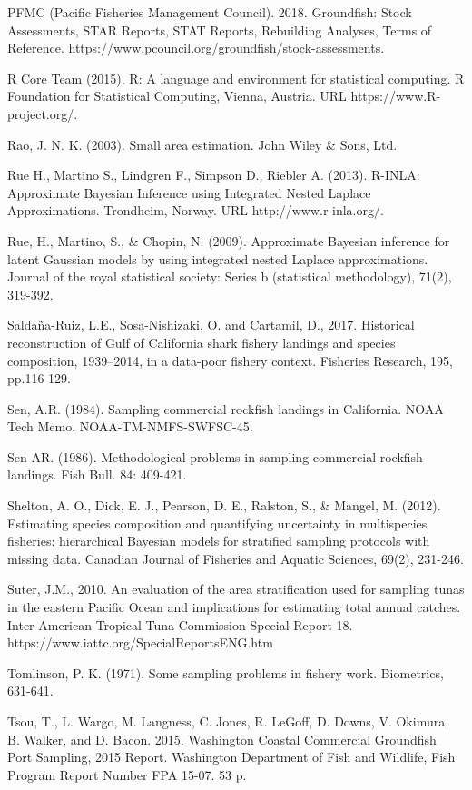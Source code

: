 \documentclass[12pt]{article}
\begin{document}
\begin{thebibliography}{1}
%
 PFMC (Pacific Fisheries Management Council). 2018. 
Groundfish: Stock Assessments, STAR Reports, STAT Reports, Rebuilding 
Analyses, Terms of Reference. https://www.pcouncil.org/groundfish/stock-assessments.

%
 R Core Team (2015). R: A language and environment for 
statistical computing. R Foundation for Statistical Computing, Vienna, 
Austria. URL https://www.R-project.org/.

%
 Rao, J. N. K. (2003). Small area estimation. John Wiley \& Sons, Ltd.

%
 Rue H., Martino S., Lindgren F., Simpson D., Riebler A. 
(2013). R-INLA: Approximate Bayesian Inference using Integrated Nested Laplace 
Approximations.  Trondheim, Norway. URL 
http://www.r-inla.org/.

%
 Rue, H., Martino, S., \& Chopin, N. (2009). Approximate 
Bayesian inference for latent Gaussian models by using integrated nested 
Laplace approximations. Journal of the royal statistical society: 
Series b (statistical methodology), 71(2), 319-392.

%
 Saldaña-Ruiz, L.E., Sosa-Nishizaki, O. and Cartamil, D., 
2017. Historical reconstruction of Gulf of California shark fishery landings 
and species composition, 1939–2014, in a data-poor fishery context. Fisheries 
Research, 195, pp.116-129.

%
 Sen, A.R. (1984). Sampling commercial rockfish landings in 
California. NOAA Tech Memo. NOAA-TM-NMFS-SWFSC-45.

%
 Sen AR. (1986). Methodological problems in sampling 
commercial rockfish landings. Fish Bull. 84: 409-421.

%
 Shelton, A. O., Dick, E. J., Pearson, D. E., Ralston, 
S., \& Mangel, M. (2012). Estimating species composition and quantifying 
uncertainty in multispecies fisheries: hierarchical Bayesian models for 
stratified sampling protocols with missing data. Canadian Journal of Fisheries 
and Aquatic Sciences, 69(2), 231-246.

%
 Suter, J.M., 2010. An evaluation of the area 
stratification used for sampling tunas in the eastern Pacific Ocean and 
implications for estimating total annual catches. Inter-American Tropical Tuna 
Commission Special Report 18. https://www.iattc.org/SpecialReportsENG.htm

%
 Tomlinson, P. K. (1971). Some sampling problems in 
fishery work. Biometrics, 631-641.

%
 Tsou, T., L. Wargo, M. Langness, C. Jones, R. LeGoff, D. 
Downs, V. Okimura, B. Walker, and D. Bacon. 2015. Washington Coastal 
Commercial Groundfish Port Sampling, 2015 Report. Washington Department of 
Fish and Wildlife, Fish Program Report Number FPA 15-07. 53 p.

\end{thebibliography}

%
\end{document}
